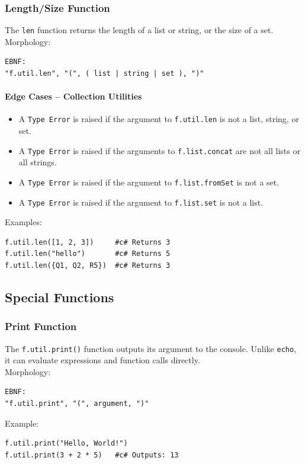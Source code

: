 \subsubsection{Length/Size Function}
The \texttt{len} function returns the length of a list or string, or the size of a set. \\
Morphology:
\begin{verbatim}
EBNF:
"f.util.len", "(", ( list | string | set ), ")"
\end{verbatim}

\paragraph{Edge Cases -- Collection Utilities}
\begin{itemize}
\item A \texttt{Type Error} is raised if the argument to \texttt{f.util.len} is not a list, string, or set.
\item A \texttt{Type Error} is raised if the arguments to \texttt{f.list.concat} are not all lists or all strings.
\item A \texttt{Type Error} is raised if the argument to \texttt{f.list.fromSet} is not a set.
\item A \texttt{Type Error} is raised if the argument to \texttt{f.list.set} is not a list.
\end{itemize}

Examples:
\begin{verbatim}
f.util.len([1, 2, 3])     #c# Returns 3
f.util.len("hello")       #c# Returns 5
f.util.len({Q1, Q2, R5})  #c# Returns 3
\end{verbatim}


\subsection{Special Functions}

\subsubsection{Print Function}
The \texttt{f.util.print()} function outputs its argument to the console. Unlike \texttt{echo}, it can evaluate expressions and function calls directly. \\
Morphology:
\begin{verbatim}
EBNF:
"f.util.print", "(", argument, ")"
\end{verbatim}
Example:
\begin{verbatim}
f.util.print("Hello, World!")
f.util.print(3 + 2 * 5)   #c# Outputs: 13
\end{verbatim}


